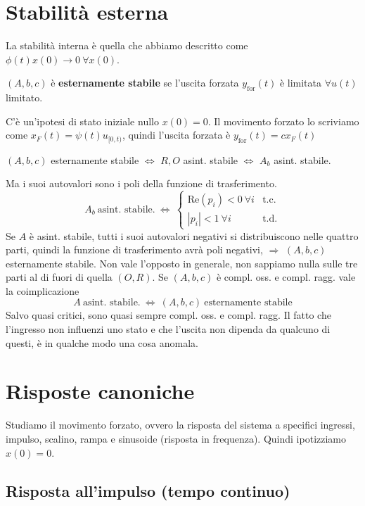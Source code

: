 \documentclass[10pt,a4paper]{book}
\begin{document}
\chapter{Stabilità esterna}

La stabilità interna è quella che abbiamo descritto come $\phi (t) x( 0)\rightarrow 0\ \forall x( 0)$.
\begin{definition}
$( A,b,c)$ è \textbf{esternamente stabile} se l'uscita forzata $y_{\text{for}}(t)$ è limitata $\forall u(t)$ limitato.
\end{definition}
C'è un'ipotesi di stato iniziale nullo $x( 0) =0$. Il movimento forzato lo scriviamo come $x_F(t) =\psi (t) u_{[ 0,t)}$, quindi l'uscita forzata è $y_{\text{for}}(t) =cx_F(t)$
\begin{theorem}
$( A,b,c)$ esternamente stabile $\Leftrightarrow $ $R,O$ asint. stabile $\Leftrightarrow $ $A_b$ asint. stabile.
\end{theorem}
Ma i suoi autovalori sono i poli della funzione di trasferimento.
\begin{equation*}
A_b \ \text{asint. stabile.} \ \Leftrightarrow \ \begin{cases}
\mathrm{Re}( p_i) < 0\ \forall i & \text{t.c.}\\
| p_i| < 1\ \forall i & \text{t.d.}
\end{cases}
\end{equation*}
Se $A$ è asint. stabile, tutti i suoi autovalori negativi si distribuiscono nelle quattro parti, quindi la funzione di trasferimento avrà poli negativi, $\Rightarrow $ $( A,b,c)$ esternamente stabile. Non vale l'opposto in generale, non sappiamo nulla sulle tre parti al di fuori di quella $( O,R)$. Se $( A,b,c)$ è compl. oss. e compl. ragg. vale la coimplicazione
\begin{equation*}
A\ \text{asint. stabile.} \ \Leftrightarrow \ ( A,b,c) \ \text{esternamente stabile}
\end{equation*}
Salvo quasi critici, sono quasi sempre compl. oss. e compl. ragg. Il fatto che l'ingresso non influenzi uno stato e che l'uscita non dipenda da qualcuno di questi, è in qualche modo una cosa anomala.
\chapter{Risposte canoniche}

Studiamo il movimento forzato, ovvero la risposta del sistema a specifici ingressi, impulso, scalino, rampa e sinusoide (risposta in frequenza). Quindi ipotizziamo $x( 0) =0$.
\section{Risposta all'impulso (tempo continuo)}
\end{document}
